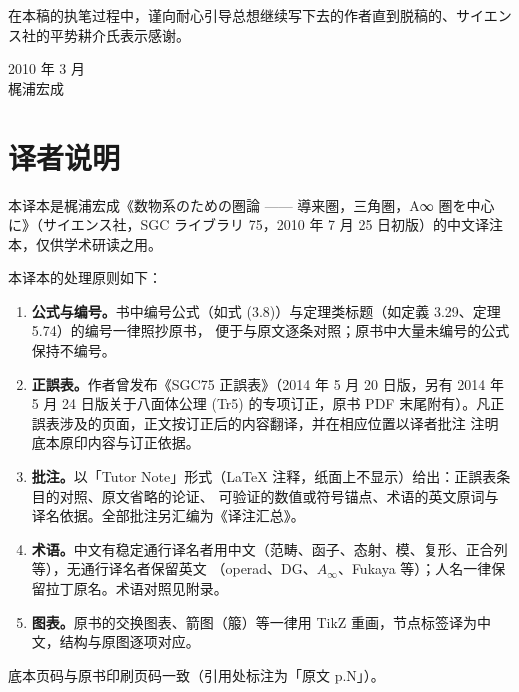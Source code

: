 在本稿的执笔过程中，谨向耐心引导总想继续写下去的作者直到脱稿的、サイエンス社的平势耕介氏表示感谢。

\begin{flushright}
2010 年 3 月\\[0.3em]
梶浦宏成
\end{flushright}

\clearpage

\chapter*{译者说明}

本译本是梶浦宏成《数物系のための圏論 —— 導来圏，三角圏，A∞ 圏を中心に》（サイエンス社，SGC ライブラリ 75，2010 年
7 月 25 日初版）的中文译注本，仅供学术研读之用。

本译本的处理原则如下：

\begin{enumerate}[leftmargin=2em,itemsep=3pt,topsep=4pt]
\item \textbf{公式与编号。}书中编号公式（如式 (3.8)）与定理类标题（如定義 3.29、定理 5.74）的编号一律照抄原书，
      便于与原文逐条对照；原书中大量未编号的公式保持不编号。
\item \textbf{正誤表。}作者曾发布《SGC75 正誤表》（2014 年 5 月 20 日版，另有 2014 年 5 月 24 日版关于八面体公理
      (Tr5) 的专项订正，原书 PDF 末尾附有）。凡正誤表涉及的页面，正文按订正后的内容翻译，并在相应位置以译者批注
      注明底本原印内容与订正依据。
\item \textbf{批注。}以「Tutor Note」形式（LaTeX 注释，纸面上不显示）给出：正誤表条目的对照、原文省略的论证、
      可验证的数值或符号锚点、术语的英文原词与译名依据。全部批注另汇编为《译注汇总》。
\item \textbf{术语。}中文有稳定通行译名者用中文（范畴、函子、态射、模、复形、正合列等），无通行译名者保留英文
      （operad、DG、$A_\infty$、Fukaya 等）；人名一律保留拉丁原名。术语对照见附录。
\item \textbf{图表。}原书的交换图表、箭图（箙）等一律用 TikZ 重画，节点标签译为中文，结构与原图逐项对应。
\end{enumerate}

底本页码与原书印刷页码一致（引用处标注为「原文 p.N」）。

\clearpage
\tableofcontents
\clearpage
